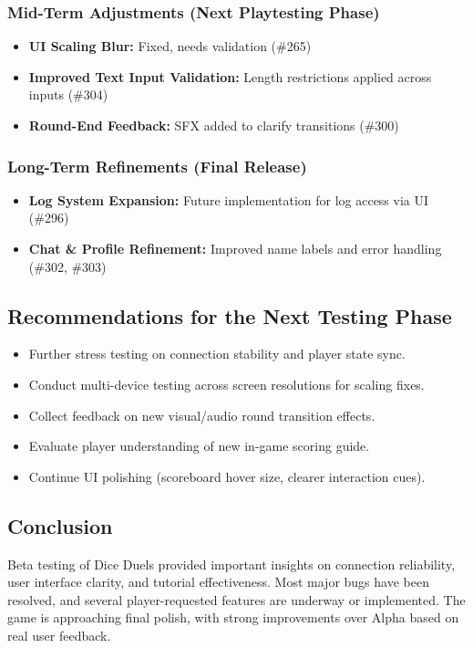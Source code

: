 \documentclass[12pt, titlepage]{article}
\begin{document}
\subsubsection{Mid-Term Adjustments (Next Playtesting Phase)}
\begin{itemize}
    \item \textbf{UI Scaling Blur:} Fixed, needs validation (\#265)
    \item \textbf{Improved Text Input Validation:} Length restrictions applied across inputs (\#304)
    \item \textbf{Round-End Feedback:} SFX added to clarify transitions (\#300)
\end{itemize}

\subsubsection{Long-Term Refinements (Final Release)}
\begin{itemize}
    \item \textbf{Log System Expansion:} Future implementation for log access via UI (\#296)
    \item \textbf{Chat \& Profile Refinement:} Improved name labels and error handling (\#302, \#303)
\end{itemize}

\subsection{Recommendations for the Next Testing Phase}
\begin{itemize}
    \item Further stress testing on connection stability and player state sync.
    \item Conduct multi-device testing across screen resolutions for scaling fixes.
    \item Collect feedback on new visual/audio round transition effects.
    \item Evaluate player understanding of new in-game scoring guide.
    \item Continue UI polishing (scoreboard hover size, clearer interaction cues).
\end{itemize}

\subsection{Conclusion}
Beta testing of Dice Duels provided important insights on connection reliability, user interface clarity, and tutorial effectiveness. Most major bugs have been resolved, and several player-requested features are underway or implemented. The game is approaching final polish, with strong improvements over Alpha based on real user feedback.
\end{document}
